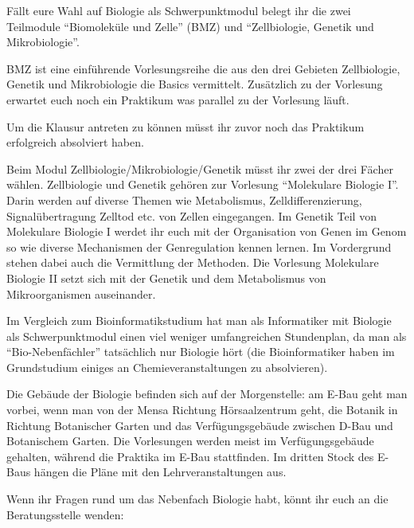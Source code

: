 Fällt eure Wahl auf Biologie als Schwerpunktmodul belegt ihr die zwei Teilmodule "`Biomoleküle und Zelle"' (BMZ) und "`Zellbiologie, Genetik und Mikrobiologie"'. 

BMZ ist eine einführende Vorlesungsreihe die aus den drei Gebieten Zellbiologie, Genetik und Mikrobiologie die Basics vermittelt. Zusätzlich zu der Vorlesung erwartet euch noch ein Praktikum was parallel zu der Vorlesung läuft.

Um die Klausur antreten zu können müsst ihr zuvor noch das Praktikum erfolgreich absolviert haben.

Beim Modul Zellbiologie/Mikrobiologie/Genetik müsst ihr zwei der drei Fächer wählen. Zellbiologie und Genetik gehören zur Vorlesung "`Molekulare Biologie I"'. Darin werden auf diverse Themen wie Metabolismus, Zelldifferenzierung, Signalübertragung Zelltod etc. von Zellen eingegangen. Im Genetik Teil von Molekulare Biologie I werdet ihr euch mit der Organisation von Genen im Genom so wie diverse Mechanismen der Genregulation kennen lernen. Im Vordergrund stehen dabei auch die Vermittlung der Methoden. Die Vorlesung Molekulare Biologie II setzt sich mit der Genetik und dem Metabolismus von Mikroorganismen auseinander.


Im Vergleich zum Bioinformatikstudium hat man als Informatiker mit Biologie als Schwerpunktmodul einen viel weniger umfangreichen Stundenplan, da man als "`Bio-Nebenfächler"' tatsächlich nur Biologie hört (die Bioinformatiker haben im Grundstudium einiges an Chemieveranstaltungen zu absolvieren).

Die Gebäude der Biologie befinden sich auf der Morgenstelle: am E-Bau geht man vorbei, wenn man von der Mensa Richtung Hörsaalzentrum geht, die Botanik in Richtung Botanischer Garten und das Verfügungsgebäude zwischen D-Bau und Botanischem Garten. Die Vorlesungen werden meist im Verfügungsgebäude gehalten, während die Praktika im E-Bau stattfinden. Im dritten Stock des E-Baus hängen die Pläne mit den Lehrveranstaltungen aus.

Wenn ihr Fragen rund um das Nebenfach Biologie habt, könnt ihr euch an die Beratungsstelle wenden:




